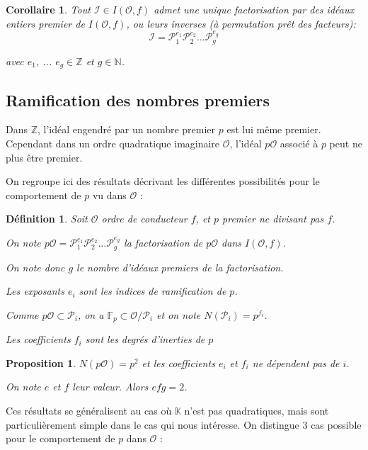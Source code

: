 \documentclass{article}
\newcommand{\N}[0]{\mathbb{N}}
\newcommand{\Z}[0]{\mathbb{Z}}
\newcommand{\K}[0]{\mathbb{K}}
\newcommand{\OR}[0]{\mathcal{O}}
\newcommand{\PR}[0]{\mathcal{P}}
\newcommand{\IR}[0]{\mathcal{I}}
\newcommand{\F}[0]{\mathbb{F}}
\newtheorem{Prop}[The]{Proposition}
\newtheorem{Def}[The]{Définition}
\newtheorem{Coro}[The]{Corollaire}
\begin{document}
\begin{Coro}
	Tout $\IR \in I(\OR,f)$ admet une unique factorisation par des idéaux entiers premier de $I(\OR,f)$, ou leurs inverses (à permutation prêt des facteurs):
	\begin{equation*}
		\IR = \PR_{1}^{e_{1}}\PR_{2}^{e_{2}}\ldots\PR_{g}^{e_{g}}
	\end{equation*}
		
	avec $e_{1}$, ... $e_{g}\in\Z$ et $g\in\N$.
		

\end{Coro}

\subsection{Ramification des nombres premiers}

Dans $\Z$, l'idéal engendré par un nombre premier $p$ est lui même premier. Cependant dans un ordre quadratique imaginaire $\OR$, l'idéal $p\OR$ associé à $p$ peut ne plus être premier. 

On regroupe ici des résultats décrivant les différentes possibilités pour le comportement de $p$ vu dans $\OR$ :

\begin{Def}
	Soit $\OR$ ordre de conducteur $f$, et $p$ premier ne divisant pas $f$.
	
	On note $p\OR = \PR_{1}^{e_{1}}\PR_{2}^{e_{2}}\ldots\PR_{g}^{e_{g}}$ la factorisation de $p\OR$ dans $I(\OR,f)$. 
	
	On note donc $g$ le nombre d'idéaux premiers de la factorisation.
	
	Les exposants $e_{i}$ sont les indices de ramification de $p$.
	
	Comme $p\OR\subset\PR_{i}$, on a $\F_{p}\subset\OR/\PR_{i}$ et on note $N(\PR_{i}) = p^{f_{i}}$. 
	
	Les coefficients $f_{i}$ sont les degrés d'inerties de $p$
\end{Def}

\begin{Prop}
	$N(p\OR) = p^{2}$ et les coefficients $e_{i}$ et $f_{i}$ ne dépendent pas de $i$. 
	
	On note $e$ et $f$ leur valeur. Alors $efg = 2$.
\end{Prop}

Ces résultats se généralisent au cas où $\K$ n'est pas quadratiques, mais sont particulièrement simple dans le cas qui nous intéresse. On distingue $3$ cas possible pour le comportement de $p$ dans $\OR$ :
\end{document}
